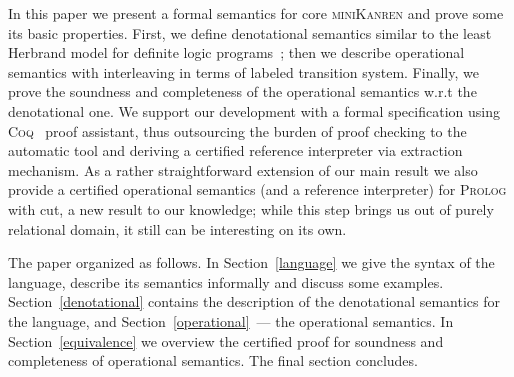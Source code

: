 In this paper we present a formal semantics for core \textsc{miniKanren} and prove some its basic properties. First,
we define denotational semantics similar to the least Herbrand model for definite logic programs~\cite{LHM}; then
we describe operational semantics with interleaving in terms of labeled transition system. Finally, we prove the soundness and
completeness of the operational semantics w.r.t the denotational one. We support our development with a formal specification
using \textsc{Coq}~\cite{Coq} proof assistant, thus outsourcing the burden of proof checking to the automatic tool and
deriving a certified reference interpreter via extraction mechanism. As a rather straightforward extension of our
main result we also provide a certified operational semantics (and a reference interpreter) for \textsc{Prolog} with cut, a new result
to our knowledge; while this step brings us out of purely relational domain, it still can be interesting on its own.

The paper organized as follows. In Section~\ref{language} we give the syntax of the language, describe its semantics
informally and discuss some examples. Section~\ref{denotational} contains the description of the denotational semantics for
the language, and Section~\ref{operational}~--- the operational semantics. In Section~\ref{equivalence} we overview the
certified proof for soundness and completeness of operational semantics. The final section concludes.
